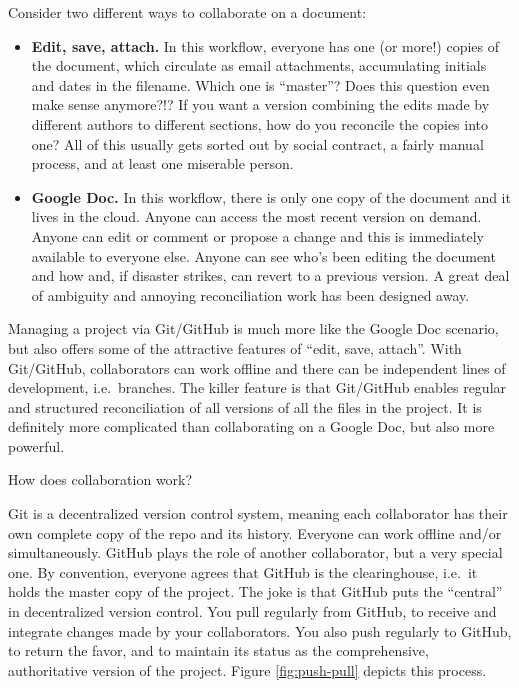 \documentclass[12pt]{article}
\begin{document}
Consider two different ways to collaborate on a document:

\begin{itemize}
\item
  \textbf{Edit, save, attach.} In this workflow, everyone has one (or
  more!) copies of the document, which circulate as email attachments,
  accumulating initials and dates in the filename. Which one is
  ``master''? Does this question even make sense anymore?!? If you want
  a version combining the edits made by different authors to different
  sections, how do you reconcile the copies into one? All of this
  usually gets sorted out by social contract, a fairly manual process,
  and at least one miserable person.
\item
  \textbf{Google Doc.} In this workflow, there is only one copy of the
  document and it lives in the cloud. Anyone can access the most recent
  version on demand. Anyone can edit or comment or propose a change and
  this is immediately available to everyone else. Anyone can see who's
  been editing the document and how and, if disaster strikes, can revert
  to a previous version. A great deal of ambiguity and annoying
  reconciliation work has been designed away.
\end{itemize}

Managing a project via Git/GitHub is much more like the Google Doc
scenario, but also offers some of the attractive features of ``edit,
save, attach''. With Git/GitHub, collaborators can work offline and
there can be independent lines of development, i.e.~branches. The killer
feature is that Git/GitHub enables regular and structured reconciliation
of all versions of all the files in the project. It is definitely more
complicated than collaborating on a Google Doc, but also more powerful.

How does collaboration work?

Git is a decentralized version control system, meaning each collaborator
has their own complete copy of the repo and its history. Everyone can
work offline and/or simultaneously. GitHub plays the role of another
collaborator, but a very special one. By convention, everyone agrees
that GitHub is the clearinghouse, i.e.~it holds the master copy of the
project. The joke is that GitHub puts the ``central'' in decentralized
version control. You pull regularly from GitHub, to receive and
integrate changes made by your collaborators. You also push regularly to
GitHub, to return the favor, and to maintain its status as the
comprehensive, authoritative version of the project. Figure
\ref{fig:push-pull} depicts this process.
\end{document}
